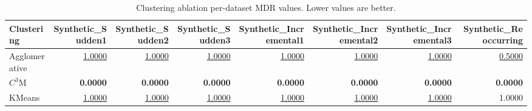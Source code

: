 \begin{table}
\caption{Clustering ablation per-dataset MDR values. Lower values are better.}
\label{tab:per-data-clustering-ablation-missed-detection-rate}
\begin{tabular}{lrrrrrrr}
\toprule
Clustering & Synthetic\_Sudden1 & Synthetic\_Sudden2 & Synthetic\_Sudden3 & Synthetic\_Incremental1 & Synthetic\_Incremental2 & Synthetic\_Incremental3 & Synthetic\_Reoccurring \\
\midrule
Agglomerative & \underline{1.0000} & \underline{1.0000} & \underline{1.0000} & \underline{1.0000} & \underline{1.0000} & \underline{1.0000} & \underline{0.5000} \\
$C^3$M & \textbf{0.0000} & \textbf{0.0000} & \textbf{0.0000} & \textbf{0.0000} & \textbf{0.0000} & \textbf{0.0000} & \textbf{0.0000} \\
KMeans & \underline{1.0000} & \underline{1.0000} & \underline{1.0000} & \underline{1.0000} & \underline{1.0000} & \underline{1.0000} & 1.0000 \\
\bottomrule
\end{tabular}
\end{table}

